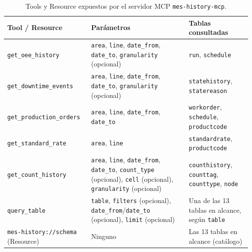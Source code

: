 \begin{table}[H]
\centering
\caption{Tools y Resource expuestos por el servidor MCP \texttt{mes-history-mcp}.}
\label{tab:tools_historico}
\small
\renewcommand{\arraystretch}{1.4}
\begin{tabular}{@{}p{3.9cm}p{5.4cm}p{3.1cm}@{}}
\hline
\textbf{Tool / Resource} & \textbf{Parámetros} & \textbf{Tablas consultadas} \\
\hline
\texttt{get\_oee\_history} & \texttt{area}, \texttt{line}, \texttt{date\_from},
\texttt{date\_to}, \texttt{granularity} (opcional) & \texttt{run}, \texttt{schedule} \\
\texttt{get\_downtime\_events} & \texttt{area}, \texttt{line}, \texttt{date\_from},
\texttt{date\_to}, \texttt{granularity} (opcional) & \texttt{statehistory},
\texttt{statereason} \\
\texttt{get\_production\_}\allowbreak\texttt{orders} & \texttt{area}, \texttt{line},
\texttt{date\_from}, \texttt{date\_to} & \texttt{workorder}, \texttt{schedule},
\texttt{productcode} \\
\texttt{get\_standard\_rate} & \texttt{area}, \texttt{line} & \texttt{standardrate},
\texttt{productcode} \\
\texttt{get\_count\_history} & \texttt{area}, \texttt{line}, \texttt{date\_from},
\texttt{date\_to}, \texttt{count\_type} (opcional), \texttt{cell} (opcional),
\texttt{granularity} (opcional) & \texttt{counthistory}, \texttt{counttag},
\texttt{counttype}, \texttt{node} \\
\texttt{query\_table} & \texttt{table}, \texttt{filters} (opcional),
\texttt{date\_from}/\texttt{date\_to} (opcional), \texttt{limit} (opcional) & Una de las 13
tablas en alcance, según \texttt{table} \\
\texttt{mes-history://schema} (Resource) & Ninguno & Las 13 tablas en alcance (catálogo) \\
\hline
\end{tabular}
\end{table}

